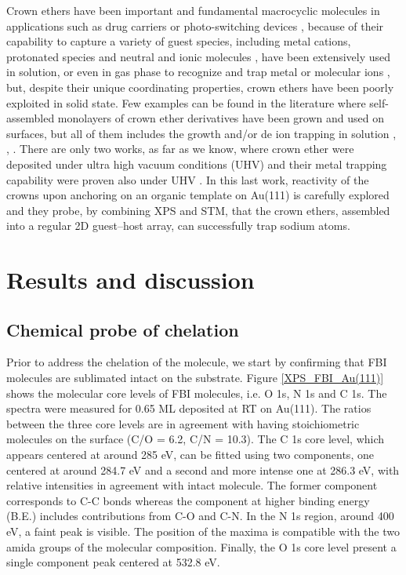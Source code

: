 \documentclass[aps,prl,reprint,longbibliography,superscriptaddress]{revtex4-1}
\begin{document}
Crown ethers have been important and fundamental macrocyclic molecules in applications such as drug carriers \cite{uchegbu_non-ionic_1998} or photo-switching devices \cite{malval_photoswitching_2002}, \cite{uda_membrane_2005} because of their capability to capture a variety of guest species, including metal cations, protonated species and neutral and ionic molecules \cite{dobler1980ionophores}, \cite{gokel_crown_1991} have been extensively used in solution, or even in gas phase to recognize and trap metal or molecular ions \cite{more_intrinsic_1999}, \cite{maleknia_cavity-size-dependent_2002} but, despite their unique coordinating properties, crown ethers have been poorly exploited in solid state. Few examples can be found in the literature where self-assembled monolayers of crown ether derivatives have been grown and used on surfaces, but all of them includes the growth and/or de ion trapping in solution \cite{yoshimoto_hostguest_2003}, \cite{flink_recognition_1999}, \cite{inokuchi_new_2015}. 
 There are only two works, as far as we know, where crown ether were deposited under ultra high vacuum conditions (UHV) \cite{feng_growth_2018} and their metal trapping capability were proven also under UHV \cite{stredansky_-surface_2019}. In this last work, reactivity of the crowns upon anchoring on an organic template on Au(111) is carefully explored and they probe, by combining XPS and STM, that the crown ethers, assembled into a regular 2D guest–host array, can successfully trap sodium atoms.

\section{Results and discussion}

\subsection{Chemical probe of chelation}
Prior to address the chelation of the molecule, we start by confirming that FBI molecules are sublimated intact on the substrate. Figure \ref{XPS_FBI_Au(111)} shows the molecular core levels of FBI molecules, i.e. O 1s, N 1s and C 1s. The spectra were measured for 0.65 ML deposited at RT on Au(111). The ratios between the three core levels are in agreement with having stoichiometric molecules on the surface (C/O = 6.2, C/N = 10.3). The C 1s core level, which appears centered at around 285 eV, can be fitted using two components, one centered at around 284.7 eV and a second and more intense one at 286.3 eV, with relative intensities in agreement with intact molecule. The former component corresponds to C-C bonds whereas the component at higher binding energy (B.E.) includes contributions from C-O and C-N. In the N 1s region, around 400 eV, a faint peak is visible. The position of the maxima is compatible with the two amida groups of the molecular composition. Finally, the O 1s core level present a single component peak centered at 532.8 eV.
\end{document}
